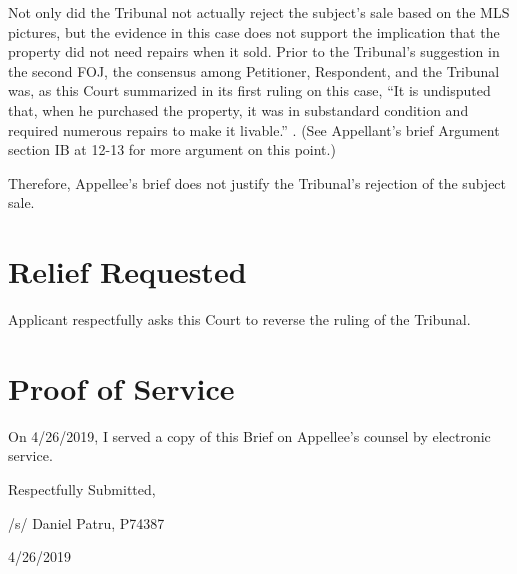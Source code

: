 \documentclass[12pt,\documentclassflag]{michiganCourtOfAppealsBrief}
\begin{document}
Not only did the Tribunal not actually reject the subject's sale based on the MLS pictures, but the evidence in this case does not support the implication that the property did not need repairs when it sold. Prior to the Tribunal's suggestion in the second FOJ, the consensus among Petitioner, Respondent, and the Tribunal was, as this Court summarized in its first ruling on this case, ``It is undisputed that, when he purchased the property, it was in substandard condition and required numerous repairs to make it livable.'' . (See Appellant's brief Argument section IB at 12-13 for more argument on this point.)

Therefore, Appellee's brief does not justify the Tribunal's rejection of the subject sale.

\section{Relief Requested}

Applicant respectfully asks this Court to reverse the ruling of the Tribunal. 

\section{Proof of Service}

On 4/26/2019, I served a copy of this Brief on Appellee's counsel by electronic service.

\vspace{1\baselineskip}

{ \setlength{\leftskip}{3.5in}

  Respectfully Submitted,

  /s/ Daniel Patru, P74387

  4/26/2019

  \setlength{\leftskip}{0pt}}

\newpage\empty%
\end{document}

